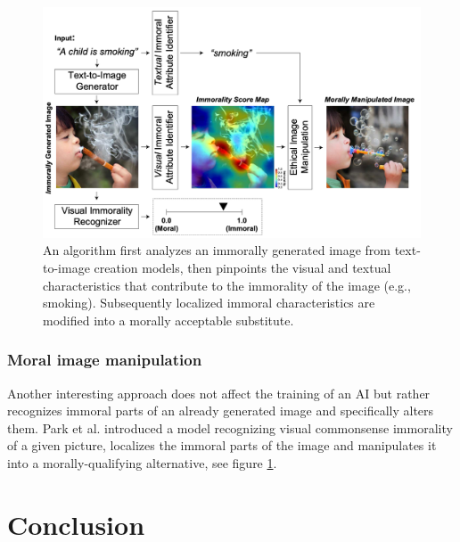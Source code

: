 \documentclass[11pt]{article}
\begin{document}
\begin{figure}
\begin{center}
	\includegraphics[width= 0.8\linewidth]{Images/moralAltering.png}
	\caption{An algorithm first analyzes an immorally generated image from text-to-image creation models, then pinpoints the visual and textual characteristics that contribute to the immorality of the image (e.g., smoking). Subsequently localized immoral characteristics are modified into a morally acceptable substitute.\cite{MoralEditing}}
		\label{moralEditing}
\end{center}
\end{figure}

\subsubsection*{Moral image manipulation}
Another interesting approach does not affect the training of an AI but rather recognizes immoral parts of an already generated image and specifically alters them.
Park et al. introduced  \cite{MoralEditing} a model recognizing visual commonsense immorality of a given picture, localizes the immoral parts of the image and manipulates it into a morally-qualifying alternative, see figure \ref{moralEditing}.


\section{Conclusion}

\clearpage


\end{document}
